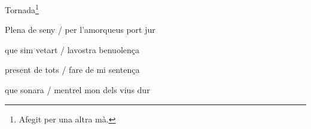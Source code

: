 \documentclass[12pt]{article}
\begin{document}
\begin{estrofaExtra}%




\begin{tornada}

Tornada\footnote{Afegit per una altra m\`{a}.}

\end{tornada}


\end{estrofaExtra}


\begin{estrofa}

 Plena de seny / per l'amorqueus port jur

 que sim vetart / lavostra benuolen\c{c}a

 present de tots / fare de mi senten\c{c}a

 que sonara / mentrel mon dels vius dur

\end{estrofa}
\end{document}
